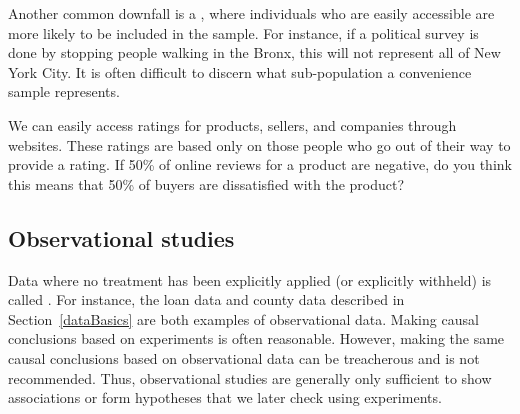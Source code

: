 Another common downfall is a
,
where individuals who are easily accessible are more likely
to be included in the sample.
For instance, if a political survey is done by stopping people
walking in the Bronx, this will not represent all of New York City.
It is often difficult to discern what sub-population a convenience
sample represents.

\begin{exercisewrap}
\begin{nexercise}
We can easily access ratings for products, sellers, and companies through websites. These ratings are based only on those people who go out of their way to provide a rating. If 50\% of online reviews for a product are negative, do you think this means that 50\% of buyers are dissatisfied with the product?\footnotemark
\end{nexercise}
\end{exercisewrap}



\D{\newpage}

\subsection{Observational studies}

Data where no treatment has been explicitly applied
(or explicitly withheld) is called .
For instance, the loan data and county data described in
Section~\ref{dataBasics}
are both examples of observational data.
Making causal conclusions based on experiments is often reasonable.
However, making the same causal conclusions based on observational
data can be treacherous and is not recommended.
Thus, observational studies are generally only sufficient
to show associations or form hypotheses that we later check
using experiments.

